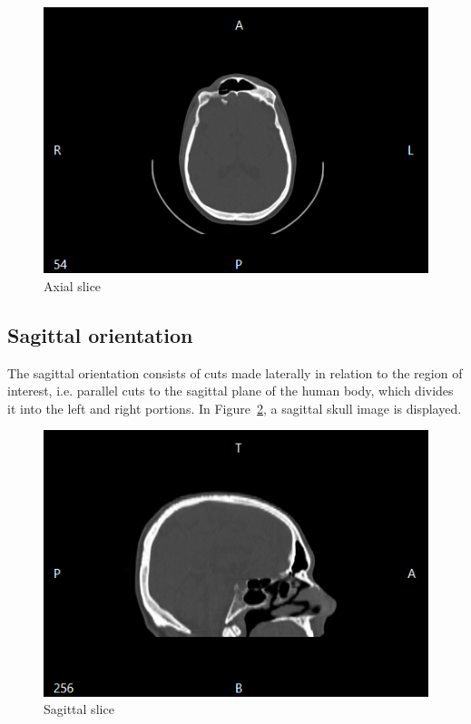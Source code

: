 \begin{figure}[!htb]
\centering
\includegraphics[scale=0.30]{../user_guide_figures/invesalius_screen/axial_en.png}
\caption{Axial slice}
\label{fig:axial_corte}
\end{figure}

\subsection{Sagittal orientation}

The sagittal orientation consists of cuts made laterally in relation to the region of interest, i.e. parallel cuts to the sagittal plane of the human body, which divides it into the left and right portions.
In Figure~\ref{fig:sagital_slice}, a sagittal skull image is displayed.

\begin{figure}[!htb]
\centering
\includegraphics[scale=0.30]{../user_guide_figures/invesalius_screen/sagital_en.png}
\caption{Sagittal slice}
\label{fig:sagital_slice}
\end{figure}

